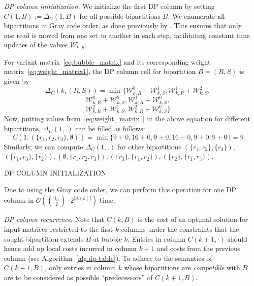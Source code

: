 \textit{DP column initialization}. 
We initialize the first DP column by setting $C(1,B):=\Delta_C(1,B)$ for all possible bipartitions $B$.
We enumerate all bipartitions in Gray code order, as done previously by \cite{patterson2014whatshap}.
This ensures that only one read is moved from one set to another in each step, facilitating constant time updates of the values $W_{k,S}^i$.

For variant matrix~\eqref{eq:bubble_matrix} and its corresponding weight matrix~\eqref{eq:weight_matrix1}, the DP column cell for bipartition $B=(R,S)$ is given by 
\[\Delta_C(k,(R,S))= \min\big\{\mathcal{W}^0_{k,R} + \mathcal{W}^1_{k,S}, \mathcal{W}^1_{k,R} + \mathcal{W}^2_{k,S}, \]
\[\mathcal{W}^0_{k,R} + \mathcal{W}^2_{k,S}, \mathcal{W}^1_{k,R} + \mathcal{W}^0_{k,S},\]
\[\mathcal{W}^2_{k,R} + \mathcal{W}^1_{k,S}, \mathcal{W}^2_{k,R} + \mathcal{W}^0_{k,S} \big\}\]
Now, putting values from~\eqref{eq:weight_matrix1} in the above equation for different bipartitions, $\Delta_C(1,.)$ can be filled as follows:
\[C(1, (\{r_1,r_2,r_3\},\emptyset)) =\min\{9+0, 16+0, 9+0,16+0, 9+0, 9+0\} = 9\]
Similarly, we can compute $\Delta_C(1,.)$ for other bipartitions $(\{r_1,r_2\},\{r_3\}),$\\
$(\{r_1,r_3\},\{r_2\}), (\emptyset,\{r_1,r_2,r_3\}), (\{r_3\},\{r_1,r_2\}), (\{r_2\},\{r_1,r_3\})$.

\begin{algorithm}
    \caption{\label{alg:dp-column}\textsc{DP COLUMN INITIALIZATION}}
\end{algorithm}
Due to using the Gray code order, we can perform this operation for one DP column in $\mathcal{O}( {|l_k| \choose 2} \cdot 2^{|A(k)|})$ time.

\textit{DP column recurrence}.
Note that $C(k,B)$ is the cost of an optimal solution for input matrices restricted to the first $k$ columns under the constraints that the sought bipartition extends $B$ at bubble $k$.
Entries in column $C(k+1,\cdot)$ should hence add up local costs incurred in column $k+1$ and costs from the previous column (see Algorithm~\ref{alg:dp-table}).
To adhere to the semantics of $C(k+1,B)$, only entries in column $k$ whose bipartitions are \emph{compatible} with $B$ are to be considered as possible ``predecessors'' of $C(k+1, B)$.

